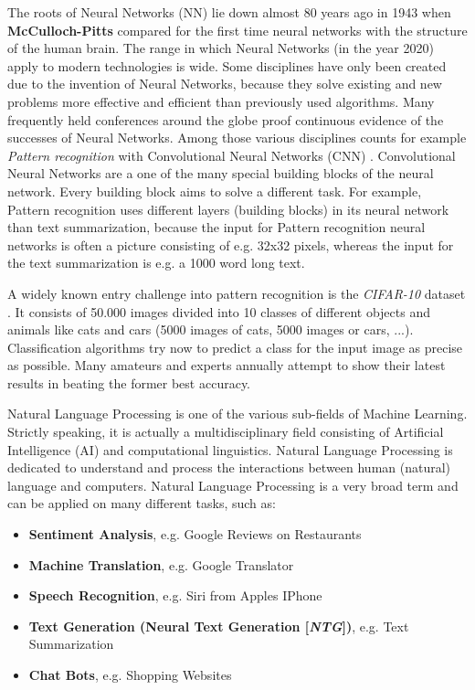 The roots of Neural Networks (NN) lie down almost 80 years ago in 1943 when \textbf{McCulloch-Pitts} \cite{NN} compared for the first time neural networks with the structure of the human brain. The range in which Neural Networks (in the year 2020) apply to modern technologies is wide. Some disciplines have only been created due to the invention of Neural Networks, because they solve existing and new problems more effective and efficient than previously used algorithms. Many frequently held conferences around the globe proof continuous evidence of the successes of Neural Networks. Among those various disciplines counts for example \textit{Pattern recognition} with Convolutional Neural Networks (CNN) \cite{cnn}. Convolutional Neural Networks are a one of the many special building blocks of the neural network. Every building block aims to solve a different task. For example, Pattern recognition uses different layers (building blocks) in its neural network than text summarization, because the input for Pattern recognition neural networks is often a picture consisting of e.g. 32x32 pixels, whereas the input for the text summarization is e.g. a 1000 word long text.  

A widely known entry challenge into pattern recognition is the \textit{CIFAR-10} dataset \cite{cifar}. It consists of 50.000 images divided into 10 classes of different objects and animals like cats and cars (5000 images of cats, 5000 images or cars, ...). Classification algorithms try now to predict a class for the input image as precise as possible. Many amateurs \cite{tim} and experts annually attempt to show their latest results in beating the former best accuracy. 

Natural Language Processing is one of the various sub-fields of Machine Learning. Strictly speaking, it is actually a multidisciplinary field consisting of Artificial Intelligence (AI) and computational linguistics. Natural Language Processing is dedicated to understand and process the interactions between human (natural) language and computers. Natural Language Processing is a very broad term and can be applied on many different tasks, such as: 

\begin{itemize}
\item \textbf{Sentiment Analysis}, e.g. Google Reviews on Restaurants
\item \textbf{Machine Translation}, e.g. Google Translator
\item \textbf{Speech Recognition}, e.g. Siri from Apples IPhone
\item \textbf{Text Generation (Neural Text Generation [\textit{NTG}])}, e.g. Text Summarization
\item \textbf{Chat Bots}, e.g. Shopping Websites
\end{itemize}

